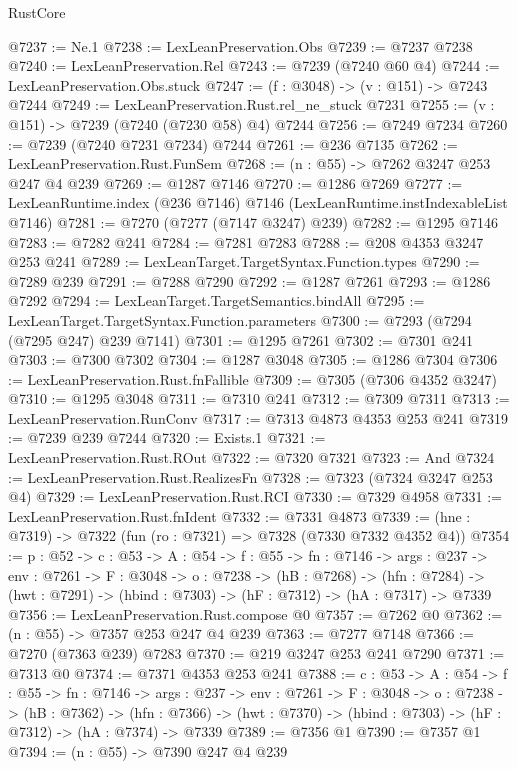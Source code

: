 \begin{lexlean}{RustCore}
\begin{coremodule}
@7237 := Ne.{1}
@7238 := LexLeanPreservation.Obs
@7239 := @7237 @7238
@7240 := LexLeanPreservation.Rel
@7243 := @7239 (@7240 @60 @4)
@7244 := LexLeanPreservation.Obs.stuck
@7247 := (f : @3048) -> (v : @151) -> @7243 @7244
@7249 := LexLeanPreservation.Rust.rel_ne_stuck @7231
@7255 := (v : @151) -> @7239 (@7240 (@7230 @58) @4) @7244
@7256 := @7249 @7234
@7260 := @7239 (@7240 @7231 @7234) @7244
@7261 := @236 @7135
@7262 := LexLeanPreservation.Rust.FunSem
@7268 := (n : @55) -> @7262 @3247 @253 @247 @4 @239
@7269 := @1287 @7146
@7270 := @1286 @7269
@7277 := LexLeanRuntime.index (@236 @7146) @7146 (LexLeanRuntime.instIndexableList @7146)
@7281 := @7270 (@7277 (@7147 @3247) @239)
@7282 := @1295 @7146
@7283 := @7282 @241
@7284 := @7281 @7283
@7288 := @208 @4353 @3247 @253 @241
@7289 := LexLeanTarget.TargetSyntax.Function.types
@7290 := @7289 @239
@7291 := @7288 @7290
@7292 := @1287 @7261
@7293 := @1286 @7292
@7294 := LexLeanTarget.TargetSemantics.bindAll
@7295 := LexLeanTarget.TargetSyntax.Function.parameters
@7300 := @7293 (@7294 (@7295 @247) @239 @7141)
@7301 := @1295 @7261
@7302 := @7301 @241
@7303 := @7300 @7302
@7304 := @1287 @3048
@7305 := @1286 @7304
@7306 := LexLeanPreservation.Rust.fnFallible
@7309 := @7305 (@7306 @4352 @3247)
@7310 := @1295 @3048
@7311 := @7310 @241
@7312 := @7309 @7311
@7313 := LexLeanPreservation.RunConv
@7317 := @7313 @4873 @4353 @253 @241
@7319 := @7239 @239 @7244
@7320 := Exists.{1}
@7321 := LexLeanPreservation.Rust.ROut
@7322 := @7320 @7321
@7323 := And
@7324 := LexLeanPreservation.Rust.RealizesFn
@7328 := @7323 (@7324 @3247 @253 @4)
@7329 := LexLeanPreservation.Rust.RCI
@7330 := @7329 @4958
@7331 := LexLeanPreservation.Rust.fnIdent
@7332 := @7331 @4873
@7339 := (hne : @7319) -> @7322 (fun (ro : @7321) => @7328 (@7330 @7332 @4352 @4))
@7354 := {p : @52} ->
  {c : @53} ->
  {A : @54} ->
  {f : @55} ->
  {fn : @7146} ->
  {args : @237} ->
  {env : @7261} ->
  {F : @3048} ->
  {o : @7238} ->
  (hB : @7268) ->
  (hfn : @7284) -> (hwt : @7291) -> (hbind : @7303) -> (hF : @7312) -> (hA : @7317) -> @7339
@7356 := LexLeanPreservation.Rust.compose @0
@7357 := @7262 @0
@7362 := (n : @55) -> @7357 @253 @247 @4 @239
@7363 := @7277 @7148
@7366 := @7270 (@7363 @239) @7283
@7370 := @219 @3247 @253 @241 @7290
@7371 := @7313 @0
@7374 := @7371 @4353 @253 @241
@7388 := {c : @53} ->
  {A : @54} ->
  {f : @55} ->
  {fn : @7146} ->
  {args : @237} ->
  {env : @7261} ->
  {F : @3048} ->
  {o : @7238} ->
  (hB : @7362) ->
  (hfn : @7366) -> (hwt : @7370) -> (hbind : @7303) -> (hF : @7312) -> (hA : @7374) -> @7339
@7389 := @7356 @1
@7390 := @7357 @1
@7394 := (n : @55) -> @7390 @247 @4 @239

\end{coremodule}
\end{lexlean}
